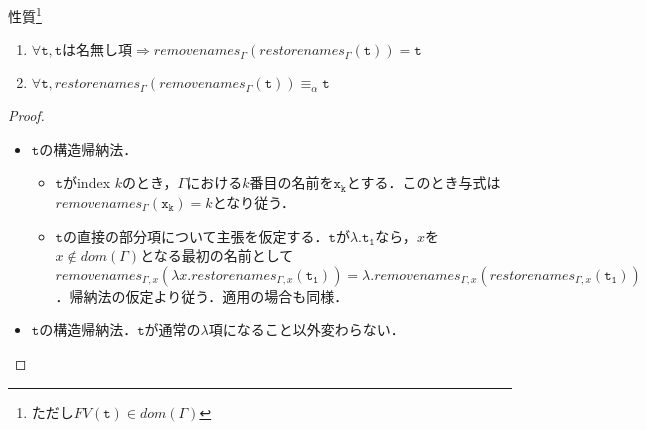 \documentclass[9pt]{beamer}
\begin{document}
\begin{frame}
\begin{alertblock}{性質}\footnote{ただし$FV(\mathtt{t})\in dom(\Gamma)$}
	\begin{enumerate}\item
	$\forall \mathtt{t},\mathtt{t}\text{は名無し項}\Rightarrow removenames_{\Gamma}(restorenames_{\Gamma}(\mathtt{t})) = \mathtt{t}$
	\item $\forall \mathtt{t}, restorenames_{\Gamma}(removenames_{\Gamma}(\mathtt{t}))\equiv_{\alpha}\mathtt{t}$
\end{enumerate}
\end{alertblock}
\begin{proof}
\begin{itemize}
\item $\mathtt{t}$の構造帰納法．\begin{itemize}\item $\mathtt{t}$がindex $k$のとき，$\Gamma$における$k$番目の名前を$\mathtt{x_{k}}$とする．このとき与式は$removenames_{\Gamma}(\mathtt{x_{k}}) = k$となり従う．\item $\mathtt{t}$の直接の部分項について主張を仮定する．$\mathtt{t}$が$\lambda. \mathtt{t_{1}}$なら，$x$を$x\notin dom(\Gamma)$となる最初の名前として$removenames_{\Gamma, x}(\lambda x. restorenames_{\Gamma,x}(\mathtt{t_{1}})) = \lambda. removenames_{\Gamma, x}(restorenames_{\Gamma, x}(\mathtt{t_{1}}))$．帰納法の仮定より従う．適用の場合も同様．\end{itemize}
\item $\mathtt{t}$の構造帰納法．$\mathtt{t}$が通常の$\lambda$項になること以外変わらない．
\end{itemize}
\end{proof}
\end{frame}
\end{document}
